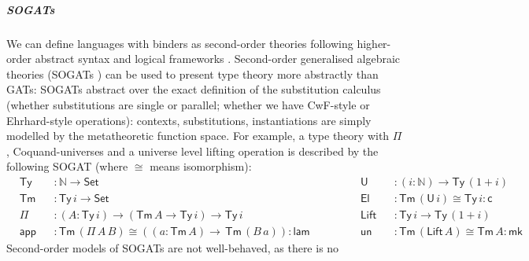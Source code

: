 \documentclass[submission,copyright,creativecommons]{eptcs}
\newcommand{\ra}{\rightarrow}
\newcommand{\Set}{\mathsf{Set}}
\newcommand{\Ty}{\mathsf{Ty}}
\newcommand{\Tm}{\mathsf{Tm}}
\newcommand{\N}{\mathbb{N}}
\newcommand{\lam}{\mathsf{lam}}
\newcommand{\app}{\mathsf{app}}
\newcommand{\U}{\mathsf{U}}
\newcommand{\El}{\mathsf{El}}
\newcommand{\cd}{\mathsf{c}}
\newcommand{\blank}{\mathord{\hspace{1pt}\text{--}\hspace{1pt}}} %
\renewcommand{\tt}{\mathsf{tt}}
\newcommand{\fst}{\mathsf{fst}}
\newcommand{\snd}{\mathsf{snd}}
\newcommand{\Lift}{\mathsf{Lift}}
\newcommand{\mk}{\mathsf{mk}}
\newcommand{\un}{\mathsf{un}}
\begin{document}
\vspace{-1em}
\subparagraph*{SOGATs}
We can define languages with binders as second-order theories
following higher-order abstract syntax \cite{DBLP:conf/lics/Hofmann99}
and logical frameworks
\cite{DBLP:journals/jacm/HarperHP93,beluga}. Second-order
generalised algebraic theories (SOGATs
\cite{uemura,DBLP:conf/fscd/KaposiX24}) can be used to present type
theory more abstractly than GATs: SOGATs abstract over the exact
definition of the substitution calculus (whether substitutions are
single or parallel; whether we have CwF-style or Ehrhard-style
operations): contexts, substitutions, instantiations are simply
modelled by the metatheoretic function space. For example, a type
theory with $\Pi$, Coquand-universes \cite{coquandUniverse} and a universe level lifting
operation is described by the following SOGAT (where $\cong$ means
isomorphism):
\begin{equation}\label{eq:tt}
\begin{alignedat}{10}
  & \Ty && : \N\ra\Set                                                             && \U && : (i:\N)\ra\Ty\,(1+i) \\           
  & \Tm && : \Ty\,i\ra\Set                                                         && \El && : \Tm\,(\U\,i)\cong\Ty\,i : \cd \\
  & \Pi && : (A:\Ty\,i)\ra(\Tm\,A\ra\Ty\,i)\ra\Ty\,i                               && \Lift && : \Ty\,i\ra\Ty\,(1+i) \\        
  & \app && : \Tm\,(\Pi\,A\,B)\cong((a:\Tm\,A)\ra\,\Tm\,(B\,a)): \lam \hspace{3em} && \un && : \Tm\,(\Lift\,A)\cong\Tm\,A : \mk
\end{alignedat}
\end{equation}
Second-order models of SOGATs are not well-behaved, as there is no
\end{document}
